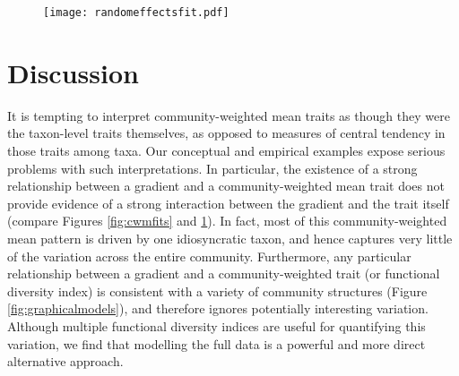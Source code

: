 \documentclass[12pt]{ecology}
\begin{document}

\begin{figure}
\caption[Density (square-root-y-axis) as a function of day-of-year (x-axis) for taxa (different panels) that vary in body length (point sizes).  Taxa are ordered by body length (given in mm in parentheses).  Lines are fitted values from two full-data-models (Eqs. \ref{eq:fdmnointeraction}, \ref{eq:fdminteraction}).  Line colour indicates the model and line type indicates whether or not taxon effects are used to compute the fitted values.  Taxon codes are:  nauplii = copepod nauplii; armoured rot = armoured rotifers (\emph{Keratella, Kellicottia, Filinia, Lecane, Trichocerca} spp.); unprotected rot = unprotected rotifers (\emph{Asplanchna, Polarthra, Gastropus} spp.), Bosmina = \emph{Bosmina longirostris}; colonial rot = colonial rotifers (\emph{Conochilus} sp.); Cycl adults = adult cyclopoid copepods; Cal cope = juvenile calanoid copepods; Holopedium = \emph{Holopedium glacialis}; Daphnia l\&d = \emph{Daphnia longiremis} and \emph{dentifera}; Daphnia cat = \emph{Daphnia catawba}; Cycl cope = juvenile cyclopoid copepods; Cal adults = adult calanoid copepods.]{}
\texttt{[image: randomeffectsfit.pdf]}
\label{fig:randomeffectsfit}
\end{figure}

\section{Discussion}

It is tempting to interpret community-weighted mean traits as though they were the taxon-level traits themselves, as opposed to measures of central tendency in those traits among taxa.  Our conceptual and empirical examples expose serious problems with such interpretations.  In particular, the existence of a strong relationship between a gradient and a community-weighted mean trait does not provide evidence of a strong interaction between the gradient and the trait itself (compare Figures \ref{fig:cwmfits} and \ref{fig:randomeffectsfit}).  In fact, most of this community-weighted mean pattern is driven by one idiosyncratic taxon, and hence captures very little of the variation across the entire community.  Furthermore, any particular relationship between a gradient and a community-weighted trait (or functional diversity index) is consistent with a variety of community structures (Figure \ref{fig:graphicalmodels}), and therefore ignores potentially interesting variation.  Although multiple functional diversity indices are useful for quantifying this variation, we find that modelling the full data is a powerful and more direct alternative approach.
\end{document}
